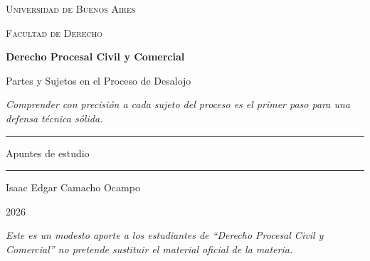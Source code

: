 \documentclass[12pt,oneside]{book}
\newcommand{\universidad}{Universidad de Buenos Aires}
\newcommand{\facultad}{Facultad de Derecho}
\newcommand{\materia}{Derecho Procesal Civil y Comercial}
\newcommand{\titulo}{Partes y Sujetos en el Proceso de Desalojo}
\newcommand{\autor}{Isaac Edgar Camacho Ocampo}
\newcommand{\anio}{2026}
\begin{document}
\begin{titlepage}

\thispagestyle{empty}

\begin{center}

\vspace*{1cm}

{\large \textsc{\universidad}}

\vspace{0.2cm}

{\large \textsc{\facultad}}

\vspace{3cm}

{\Huge \textbf{\materia}}

\vspace{1cm}

{\LARGE \titulo}

\vspace{0.8cm}

\textit{Comprender con precisión a cada sujeto del proceso es el primer paso para una defensa técnica sólida.}

\vspace{1.2cm}

\rule{0.70\textwidth}{0.5pt}

\vspace{0.5cm}

{\large Apuntes de estudio}

\vspace{0.5cm}

\rule{0.70\textwidth}{0.5pt}

\vfill

{\large \autor}

\vspace{0.3cm}

{\large \anio}

\end{center}

\vfill

\begin{flushleft}
\textit{Este es un modesto aporte a los estudiantes de ``Derecho Procesal Civil y Comercial'' no pretende sustituir el material oficial de la materia.}
\end{flushleft}

\end{titlepage}

\tableofcontents
\end{document}
